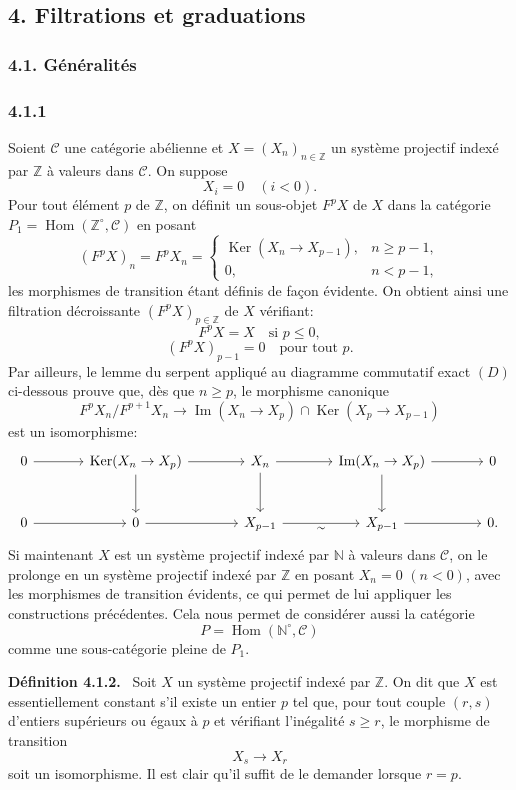 \documentclass[11pt]{article}
\providecommand{\ZZ}{\mathbb{Z}}
\providecommand{\NN}{\mathbb{N}}
\newenvironment{statement}[1]{\par\medskip\noindent\textbf{#1.}\ }{\par\medskip}
\DeclareMathOperator{\Hom}{Hom}
\providecommand{\Ker}{\operatorname{Ker}}
\providecommand{\Hom}{\operatorname{Hom}}
\providecommand{\NN}{\mathbb N}
\providecommand{\cC}{\mathcal C}
\providecommand{\Im}{\operatorname{Im}}
\providecommand{\Ker}{\operatorname{Ker}}
\renewcommand{\Im}{\operatorname{Im}}
\providecommand{\Ker}{\operatorname{Ker}}
\providecommand{\Im}{\operatorname{Im}}
\providecommand{\cC}{\mathcal C}
\begin{document}
\subsection*{4. Filtrations et graduations}
\subsubsection*{4.1. Généralités}
\subsubsection*{4.1.1}
Soient $\cC$ une catégorie abélienne et $X=(X_n)_{n\in\ZZ}$ un système projectif indexé par $\ZZ$ à valeurs dans $\cC$. On suppose
\[
X_i=0\quad(i<0).
\]
Pour tout élément $p$ de $\ZZ$, on définit un sous-objet $F^pX$ de $X$ dans la catégorie $P_1=\Hom(\ZZ^\circ,\cC)$ en posant
\[
(F^pX)_n=F^pX_n=
\begin{cases}
\Ker(X_n\to X_{p-1}),& n\ge p-1,\\
0,& n<p-1,
\end{cases}
\]
les morphismes de transition étant définis de façon évidente. On obtient ainsi une filtration décroissante $(F^pX)_{p\in\ZZ}$ de $X$ vérifiant:
\[
F^pX=X\quad\text{si }p\le0,
\]
\[
(F^pX)_{p-1}=0\quad\text{pour tout }p.
\]
Par ailleurs, le lemme du serpent appliqué au diagramme commutatif exact $(D)$ ci-dessous prouve que, dès que $n\ge p$, le morphisme canonique
\[
F^pX_n/F^{p+1}X_n\longrightarrow \Im(X_n\to X_p)\cap\Ker(X_p\to X_{p-1})
\]
est un isomorphisme:
\[
\begin{tikzcd}[column sep=large,row sep=large]
0 \arrow[r] & \Ker(X_n\to X_p) \arrow[r] \arrow[d] & X_n \arrow[r] \arrow[d] & \Im(X_n\to X_p) \arrow[r] \arrow[d] & 0\\
0 \arrow[r] & 0 \arrow[r] & X_{p-1} \arrow[r,"\sim"'] & X_{p-1} \arrow[r] & 0 .
\end{tikzcd}
\]
Si maintenant $X$ est un système projectif indexé par $\NN$ à valeurs dans $\cC$, on le prolonge en un système projectif indexé par $\ZZ$ en posant $X_n=0$ $(n<0)$, avec les morphismes de transition évidents, ce qui permet de lui appliquer les constructions précédentes. Cela nous permet de considérer aussi la catégorie
\[
P=\Hom(\NN^\circ,\cC)
\]
comme une sous-catégorie pleine de $P_1$.

\begin{statement}{Définition 4.1.2}
Soit $X$ un système projectif indexé par $\ZZ$. On dit que $X$ est essentiellement constant s'il existe un entier $p$ tel que, pour tout couple $(r,s)$ d'entiers supérieurs ou égaux à $p$ et vérifiant l'inégalité $s\ge r$, le morphisme de transition
\[
X_s\longrightarrow X_r
\]
soit un isomorphisme. Il est clair qu'il suffit de le demander lorsque $r=p$.
\end{statement}
\end{document}

